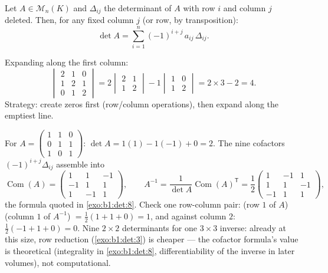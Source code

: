 \begin{theorem}\label{thm:b1:det:cofactor}
Let $A \in \mathcal{M}_n(K)$ and $\Delta_{ij}$ the determinant of
$A$ with row $i$ and column $j$ deleted. Then, for any fixed column
$j$ (or row, by transposition):
\[
\det A = \sum_{i=1}^{n} (-1)^{i+j}\, a_{ij}\, \Delta_{ij} .
\]
\end{theorem}
\admitted

\begin{example}\label{ex:b1:det:cofactor}
Expanding along the first column:
\[
\begin{vmatrix}
2 & 1 & 0\\
1 & 2 & 1\\
0 & 1 & 2
\end{vmatrix}
= 2\begin{vmatrix} 2 & 1\\ 1 & 2\end{vmatrix}
- 1\begin{vmatrix} 1 & 0\\ 1 & 2\end{vmatrix}
= 2 \times 3 - 2 = 4 .
\]
Strategy: create zeros first (row/column operations), then expand
along the emptiest line.
\end{example}

\begin{example}
\label{ex:b1:det:cofactorinverse}
For $A = \begin{pmatrix} 1 & 1 & 0\\ 0 & 1 & 1\\ 1 & 0 &
1\end{pmatrix}$: $\det A = 1(1) - 1(-1) + 0 = 2$. The nine
cofactors $(-1)^{i+j}\Delta_{ij}$ assemble into
\[
\operatorname{Com}(A) = \begin{pmatrix}
1 & 1 & -1\\
-1 & 1 & 1\\
1 & -1 & 1
\end{pmatrix},
\qquad
A^{-1} = \frac{1}{\det A}\operatorname{Com}(A)^{\mathsf T}
= \frac12\begin{pmatrix}
1 & -1 & 1\\
1 & 1 & -1\\
-1 & 1 & 1
\end{pmatrix},
\]
the formula quoted in \cref{exo:b1:det:8}. Check one row-column
pair: (row $1$ of $A$)(column $1$ of $A^{-1}$) $= \frac12(1 + 1
+ 0) = 1$, and against column $2$: $\frac12(-1 + 1 + 0) = 0$.
Nine $2\times2$ determinants for one $3\times3$ inverse: already
at this size, row reduction (\cref{exo:b1:det:3}) is cheaper ---
the cofactor formula's value is theoretical (integrality in
\cref{exo:b1:det:8}, differentiability of the inverse in later
volumes), not computational.
\end{example}

